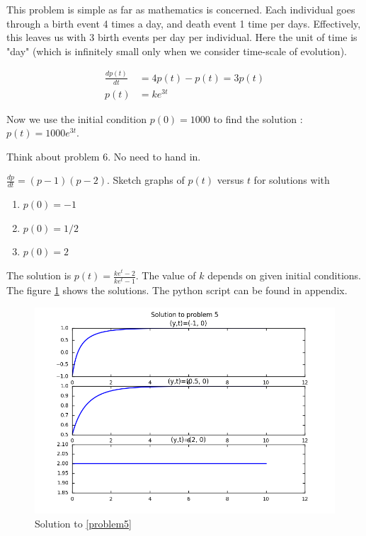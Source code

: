 \begin{questions}
\begin{solution}

This problem is simple as far as mathematics is concerned.  Each individual
goes through a birth event 4 times a day, and death event 1 time per days.
Effectively, this leaves us with 3 birth events per day per individual. Here
the unit of time is "day" (which is infinitely small only when we consider
time-scale of evolution).

\begin{align}
\frac{dp(t)}{dt} &= 4 p(t) - p(t) = 3 p(t) \\
p(t) &= k e^{3t}
\end{align}

Now we use the initial condition $p(0) = 1000$ to find the solution : $ p(t)  = 1000e^{3t} $.

\end{solution}

\question
    Think about problem 6. No need to hand in.


\question[5]
\label{problem5}
    $\frac{dp}{dt} = (p-1)(p-2)$. Sketch graphs of $p(t)$ versus $t$ for
    solutions with

    \begin{enumerate}
        \item $ p(0) = -1 $
        \item $ p(0) = 1/2 $
        \item $ p(0) = 2 $
    \end{enumerate}

\begin{solution}

The solution is $p(t) = \frac{ke^t-2}{ke^t -1} $. The value of $k$ depends on
given initial conditions. The figure \ref{fig:problem5} shows the solutions. The
python script can be found in appendix.

\end{solution}

\begin{figure}[htpb]
    \centering
    \includegraphics[width=0.8\linewidth]{./solve_problem5_py.png}
    \caption{Solution to \ref{problem5}}
    \label{fig:problem5}
\end{figure}


\end{questions}
